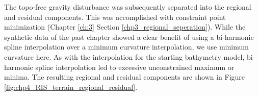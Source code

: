 
The topo-free gravity disturbance was subsequently separated into the regional and residual components. This was accomplished with constraint point minimization (Chapter \ref{ch:3} Section \ref{chp3_regional_seperation}). While the synthetic data of the past chapter showed a clear benefit of using a bi-harmonic spline interpolation over a minimum curvature interpolation, we use minimum curvature here. As with the interpolation for the starting bathymetry model, bi-harmonic spline interpolation led to excessive unconstrained maximum or minima. The resulting regional and residual components are shown in Figure \ref{fig:chp4_RIS_terrain_regional_residual}. \\

